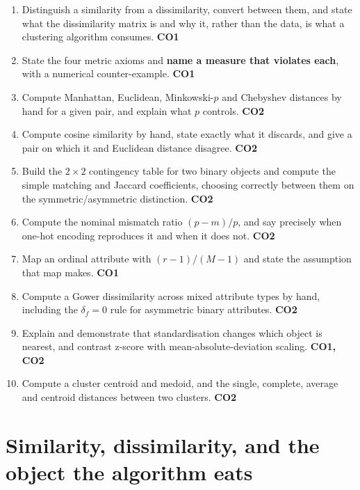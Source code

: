 \documentclass[11pt]{article}
\begin{document}
\begin{enumerate}[leftmargin=*]
  \item Distinguish a similarity from a dissimilarity, convert between them,
    and state what the dissimilarity matrix is and why it, rather than the
    data, is what a clustering algorithm consumes. \hfill \textbf{CO1}
  \item State the four metric axioms and \textbf{name a measure that violates
    each}, with a numerical counter-example. \hfill \textbf{CO1}
  \item Compute Manhattan, Euclidean, Minkowski-$p$ and Chebyshev distances
    by hand for a given pair, and explain what $p$ controls. \hfill
    \textbf{CO2}
  \item Compute cosine similarity by hand, state exactly what it discards,
    and give a pair on which it and Euclidean distance disagree. \hfill
    \textbf{CO2}
  \item Build the $2\times2$ contingency table for two binary objects and
    compute the simple matching and Jaccard coefficients, choosing correctly
    between them on the symmetric/asymmetric distinction. \hfill \textbf{CO2}
  \item Compute the nominal mismatch ratio $(p-m)/p$, and say precisely when
    one-hot encoding reproduces it and when it does not. \hfill \textbf{CO2}
  \item Map an ordinal attribute with $(r-1)/(M-1)$ and state the assumption
    that map makes. \hfill \textbf{CO1}
  \item Compute a Gower dissimilarity across mixed attribute types by hand,
    including the $\delta_f = 0$ rule for asymmetric binary attributes.
    \hfill \textbf{CO2}
  \item Explain and demonstrate that standardisation changes which object is
    nearest, and contrast z-score with mean-absolute-deviation scaling.
    \hfill \textbf{CO1, CO2}
  \item Compute a cluster centroid and medoid, and the single, complete,
    average and centroid distances between two clusters. \hfill \textbf{CO2}
\end{enumerate}

\section{Similarity, dissimilarity, and the object the algorithm eats}
\label{sec:vocab}
\end{document}
